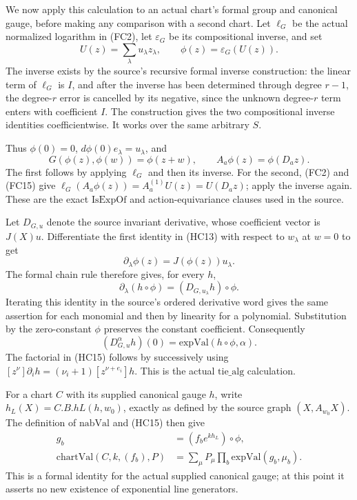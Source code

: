 We now apply this calculation to an actual chart's
formal group and canonical gauge, before making any
comparison with a second chart.
Let \(\ell_G\) be the actual normalized logarithm in
(FC2), let \(\varepsilon_G\) be its compositional
inverse, and set
\[
 U(z)=\sum_\lambda u_\lambda z_\lambda,\qquad
                          \phi(z)=\varepsilon_G(U(z)).
 \tag{HC12}
\]
The inverse exists by the source's recursive formal
inverse construction: the linear term of \(\ell_G\)
is \(I\), and after the inverse has been determined
through degree \(r-1\), the degree-\(r\) error is
cancelled by its negative, since the unknown
degree-\(r\) term enters with coefficient \(I\).
The construction gives the two compositional
inverse identities coefficientwise.
It works over the same arbitrary \(S\).

Thus \(\phi(0)=0\), \(d\phi(0)e_\lambda=u_\lambda\),
and
\[
              G(\phi(z),\phi(w))=\phi(z+w),\qquad
                   A_a\phi(z)=\phi(D_a z).                \tag{HC13}
\]
The first follows by applying \(\ell_G\) and then
its inverse.
For the second, (FC2) and (FC15) give
\(\ell_G(A_a\phi(z))=A_a^{(1)}U(z)=U(D_a z)\);
apply the inverse again.
These are the exact \(\mathrm{IsExpOf}\) and
action-equivariance clauses used in the source.

Let \(D_{G,u}\) denote the source invariant derivative,
whose coefficient vector is \(J(X)u\).
Differentiate the first identity in (HC13) with respect
to \(w_\lambda\) at \(w=0\) to get
\[
                  \partial_\lambda\phi(z)
                                      =J(\phi(z))u_\lambda.
\]
The formal chain rule therefore gives, for every \(h\),
\[
          \partial_\lambda(h\circ\phi)
                              =(D_{G,u_\lambda}h)\circ\phi.
 \tag{HC14}
\]
Iterating this identity in the source's ordered
derivative word gives the same assertion for each
monomial and then by linearity for a polynomial.
Substitution by the zero-constant \(\phi\) preserves
the constant coefficient.
Consequently
\[
 (D_{G,u}^{\alpha}h)(0)
                        =\mathrm{expVal}(h\circ\phi,\alpha).
 \tag{HC15}
\]
The factorial in (HC15) follows by successively using
\([z^\nu]\partial_i h=(\nu_i+1)[z^{\nu+e_i}]h\).
This is the actual \(\mathrm{tie\_alg}\) calculation.

For a chart \(C\) with its supplied canonical gauge
\(h\), write \(h_L(X)=C.B.hL(h,w_0)\), exactly as
defined by the source graph \((X,A_{w_0}X)\).
The definition of \(\mathrm{nabVal}\) and (HC15)
then give
\[
 \begin{split}
 g_b&=(f_b e^{kh_L})\circ\phi,\\
 \mathrm{chartVal}(C,k,(f_b),P)
      &=\sum_\mu P_\mu
                       \prod_b\mathrm{expVal}(g_b,\mu_b).
 \end{split}                                                   \tag{HC16}
\]
This is a formal identity for the actual supplied
canonical gauge; at this point it asserts no new
existence of exponential line generators.

